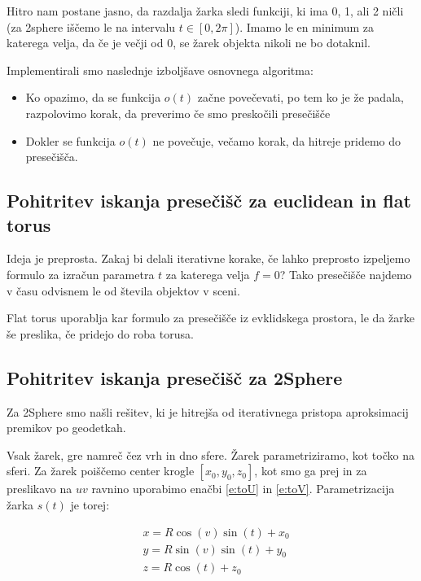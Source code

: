 \documentclass[titlepage]{article}
\begin{document}
Hitro nam postane jasno, da razdalja žarka sledi funkciji, ki ima 0, 1, ali 2 ničli (za 2sphere iščemo le na intervalu \(t \in [0, 2\pi] \)). 
Imamo le en minimum za katerega velja, da če je večji od 0, se žarek objekta nikoli ne bo dotaknil.

Implementirali smo naslednje izboljšave osnovnega algoritma:
\begin{itemize}
  \item Ko opazimo, da se funkcija \( o(t) \) začne povečevati, po tem ko je že padala, 
  razpolovimo korak, da preverimo če smo preskočili presečišče
  \item Dokler se funkcija \( o(t) \) ne povečuje, večamo korak, da hitreje pridemo do presečišča.
\end{itemize}

\subsection{Pohitritev iskanja presečišč za euclidean in flat torus}

Ideja je preprosta. Zakaj bi delali iterativne korake, če lahko preprosto izpeljemo 
formulo za izračun parametra \( t \) za katerega velja \( f = 0 \)? Tako presečišče 
najdemo v času odvisnem le od števila objektov v sceni.

Flat torus uporablja kar formulo za presečišče iz evklidskega prostora, le da žarke še preslika, če pridejo do roba torusa.

\subsection{Pohitritev iskanja presečišč za 2Sphere}

Za 2Sphere smo našli rešitev, ki je hitrejša od iterativnega pristopa aproksimacij premikov po geodetkah.

Vsak žarek, gre namreč čez vrh in dno sfere. Žarek parametriziramo, kot točko na sferi. Za žarek poiščemo center 
krogle \( [x_0, y_0, z_0] \), kot smo ga prej in za preslikavo na $uv$ ravnino uporabimo enačbi \ref{e:toU} in \ref{e:toV}. 
Parametrizacija žarka \(s(t)\) je torej:

\begin{equation}
  \begin{split}
    &x = R\cos(v)\sin(t) + x_0 \\
    &y = R\sin(v) \sin(t) + y_0 \\
    &z = R\cos(t) + z_0
  \end{split}
\end{equation}
\end{document}
